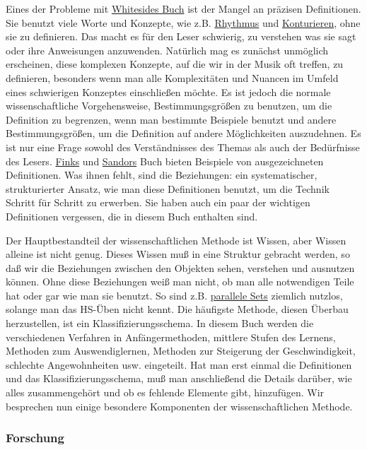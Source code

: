 Eines der Probleme mit \hyperref[Whiteside]{Whitesides Buch} ist der Mangel an präzisen Definitionen.
Sie benutzt viele Worte und Konzepte, wie z.B. \hyperref[c1iii1b]{Rhythmus} und \hyperref[c1iii8]{Konturieren}, ohne sie zu definieren.
Das macht es für den Leser schwierig, zu verstehen was sie sagt oder ihre Anweisungen anzuwenden.
Natürlich mag es zunächst unmöglich erscheinen, diese komplexen Konzepte, auf die wir in der Musik oft treffen, zu definieren, besonders wenn man alle Komplexitäten und Nuancen im Umfeld eines schwierigen Konzeptes einschließen möchte.
Es ist jedoch die normale wissenschaftliche Vorgehensweise, Bestimmungsgrößen zu benutzen, um die Definition zu begrenzen, wenn man bestimmte Beispiele benutzt und andere Bestimmungsgrößen, um die Definition auf andere Möglichkeiten auszudehnen.
Es ist nur eine Frage sowohl des Verständnisses des Themas als auch der Bedürfnisse des Lesers.
\hyperref[Fink]{Finks} und \hyperref[Sandor]{Sandors} Buch bieten Beispiele von ausgezeichneten Definitionen.
Was ihnen fehlt, sind die Beziehungen: ein systematischer, strukturierter Ansatz, wie man diese Definitionen benutzt, um die Technik Schritt für Schritt zu erwerben.
Sie haben auch ein paar der wichtigen Definitionen vergessen, die in diesem Buch enthalten sind.

Der Hauptbestandteil der wissenschaftlichen Methode ist Wissen, aber Wissen alleine ist nicht genug.
Dieses Wissen muß in eine Struktur gebracht werden, so daß wir die Beziehungen zwischen den Objekten sehen, verstehen und ausnutzen können.
Ohne diese Beziehungen weiß man nicht, ob man alle notwendigen Teile hat oder gar wie man sie benutzt.
So sind z.B. \hyperref[c1ii11]{parallele Sets} ziemlich nutzlos, solange man das HS-Üben nicht kennt.
Die häufigste Methode, diesen Überbau herzustellen, ist ein Klassifizierungsschema.
In diesem Buch werden die verschiedenen Verfahren in Anfängermethoden, mittlere Stufen des Lernens, Methoden zum Auswendiglernen, Methoden zur Steigerung der Geschwindigkeit, schlechte Angewohnheiten usw. eingeteilt.
Hat man erst einmal die Definitionen und das Klassifizierungsschema, muß man anschließend die Details darüber, wie alles zusammengehört und ob es fehlende Elemente gibt, hinzufügen.
Wir besprechen nun einige besondere Komponenten der wissenschaftlichen Methode.


\subsubsection{Forschung}
\label{c3_3c}

